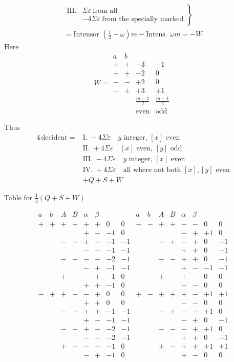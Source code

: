 \[
\begin{gathered}
\left.\begin{array}{rl}
\mathrm{III.}&\Sigma\varepsilon\ \text{from all}\\
&-4\Sigma\varepsilon\ \text{from the specially marked}
\end{array}\right\}\\
={}\text{Intensor }(\tfrac12-\omega)m-\text{Intens. }\omega m=-W
\end{gathered}
\]
Here
\[
W=\begin{array}{cc|rr}
a&b&&\\
+&+&-3&-1\\
-&+&-2&0\\
-&-&+2&0\\
-&+&+3&+1\\[3pt]
&&\frac{m-1}{2}&\frac{m-1}{2}\\
&&\text{even}&\text{odd}
\end{array}
\]

Thus
\[
\begin{aligned}
4\,\text{decident}={}&\text{I.}\;-4\Sigma\varepsilon\quad y\text{ integer, }[x]\text{ even}\\
&\text{II.}\;+4\Sigma\varepsilon\quad[x]\text{ even, }[y]\text{ odd}\\
&\text{III.}\;-4\Sigma\varepsilon\quad y\text{ integer, }[x]\text{ even}\\
&\text{IV.}\;+4\Sigma\varepsilon\quad\text{all where not both }[x],[y]\text{ even}\\
&+Q+S+W
\end{aligned}
\]

\begin{center}Table for $\frac14(Q+S+W)$\end{center}
\begingroup\small\setlength{\arraycolsep}{2pt}
\[
\begin{array}{cccccc|rr||cccccc|rr}
a&b&A&B&\alpha&\beta&&&a&b&A&B&\alpha&\beta&&\\
+&+&+&+&+&+&0&0&-&-&+&+&-&-&0&0\\
&&&&+&-&-1&0&&&&&-&+&+1&0\\
&&-&+&+&-&-1&-1&&&-&+&-&+&0&-1\\
&&&&-&-&-1&-1&&&&&+&+&0&-1\\
&&-&-&-&-&-2&-1&&&-&-&+&+&0&-1\\
&&&&-&+&-1&-1&&&&&+&-&-1&-1\\
&&+&-&-&+&-1&0&&&+&-&+&-&0&0\\
&&&&+&+&-1&0&&&&&-&-&0&0\\[3pt]
-&+&+&+&-&+&0&0&+&-&+&+&+&-&+1&+1\\
&&&&+&+&0&0&&&&&-&-&0&0\\
&&-&+&+&+&-1&-1&&&-&+&-&-&+1&0\\
&&&&+&-&-1&-1&&&&&-&+&0&-1\\
&&-&-&+&-&-2&-1&&&-&-&-&+&+1&0\\
&&&&-&-&-2&-1&&&&&+&+&0&-1\\
&&+&-&-&-&-1&0&&&+&-&+&+&+1&+1\\
&&&&-&+&-1&0&&&&&+&-&0&0\\
\end{array}
\]
\endgroup

